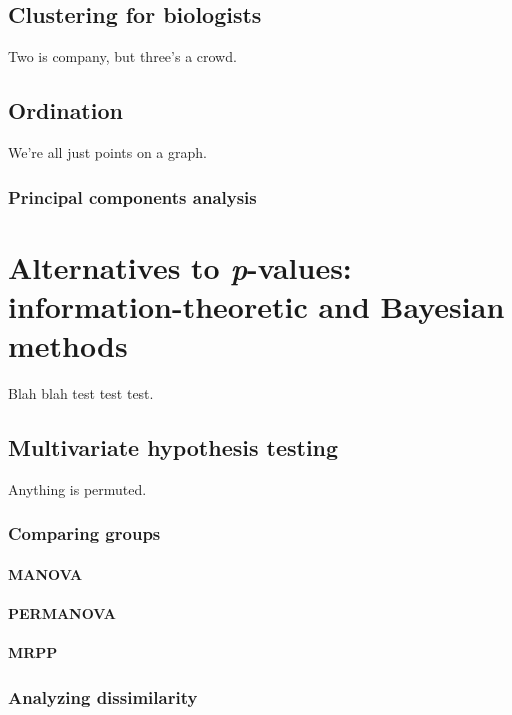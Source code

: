 \documentclass[
  13,
  letterpaper,
]{report}
\begin{document}
\chapter{Clustering for biologists}\label{sec-clust}

Two is company, but three's a crowd.

\chapter{Ordination}\label{sec-ord}

We're all just points on a graph.

\section{Principal components analysis}\label{sec-ord-pca}

\part{Alternatives to \emph{p}-values: information-theoretic and
Bayesian methods}

Blah blah test test test.

\chapter{Multivariate hypothesis testing}\label{sec-mtest}

Anything is permuted.

\section{Comparing groups}\label{sec-mtest-group}

\subsection{MANOVA}\label{sec-mtest-group-man}

\subsection{PERMANOVA}\label{sec-mtest-group-perm}

\subsection{MRPP}\label{sec-mtest-group-mrpp}

\section{Analyzing dissimilarity}\label{sec-mtest-dis}
\end{document}

